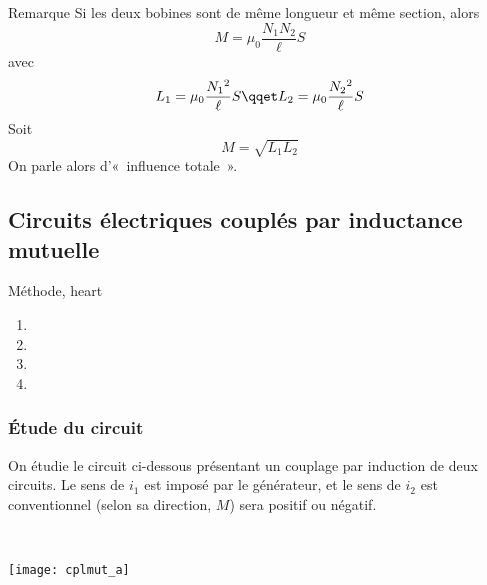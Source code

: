 \documentclass[../main/main.tex]{subfiles}
\begin{document}
\begin{rrema}{Remarque}
	Si les deux bobines sont de même longueur et même section, alors
	\[
		M = \mu_0 \frac{N_1N_2}{\ell }S
	\]
	avec
	\[
		L_1 = \mu_0 \frac{N_1{}^{2}}{\ell }S
		\qqet
		L_2 = \mu_0 \frac{N_2{}^{2}}{\ell }S
	\]
	Soit
	\[
		\boxed{M = \sqrt{L_1L_2}}
	\]
	On parle alors d'«~influence totale~».
\end{rrema}

\subsection{Circuits électriques couplés par inductance mutuelle}
\label{ssec:inducmutcpl}

\begin{tprop}{Méthode, heart}
	\begin{enumerate}
		\item {}
		\item {}
		\item {}
		\item {}
	\end{enumerate}
\end{tprop}

\subsubsection{Étude du circuit}
\label{ssec:mutcpletude}
\noindent
\begin{minipage}[t]{.49\linewidth}
	On étudie le circuit ci-dessous présentant un couplage par induction de deux
	circuits. Le sens de $i_1$ est imposé par le générateur, et le sens de $i_2$ est
	conventionnel (selon sa direction, $M$) sera positif ou négatif.
\end{minipage}
\hfill
\begin{minipage}[t]{.49\linewidth}
	~
	\vspace*{-40pt}
	\begin{center}
		\texttt{[image: cplmut\_a]}
		\label{fig:cplmut_a}
	\end{center}
\end{minipage}
\smallbreak
\end{document}
